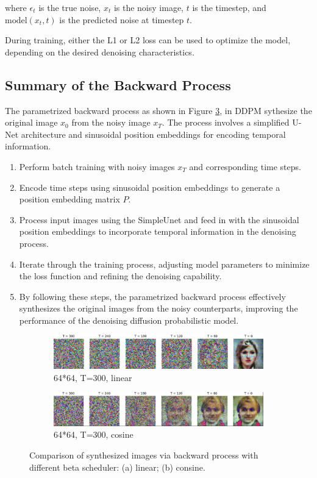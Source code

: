 \documentclass[letterpaper]{article} %
\begin{document}
\noindent where $\epsilon_t$ is the true noise, $x_t$ is the noisy image, $t$ is the timestep, and $\text{model}(x_t, t)$ is the predicted noise at timestep $t$.

During training, either the L1 or L2 loss can be used to optimize the model, depending on the desired denoising characteristics.

\subsection{Summary of the Backward Process}
The parametrized backward process as shown in Figure \ref{fig:figure4}, in DDPM sythesize the original image $x_0$ from the noisy image $x_T$. The process involves a simplified U-Net architecture and sinusoidal position embeddings for encoding temporal information.
\begin{enumerate}
\item Perform batch training with noisy images $x_T$ and corresponding time steps.
\item Encode time steps using sinusoidal position embeddings to generate a position embedding matrix $P$.
\item Process input images using the SimpleUnet and feed in with the sinusoidal position embeddings to incorporate temporal information in the denoising process.
\item Iterate through the training process, adjusting model parameters to minimize the loss function and refining the denoising capability.
\item By following these steps, the parametrized backward process effectively synthesizes the original images from the noisy counterparts, improving the performance of the denoising diffusion probabilistic model.
\end{enumerate}

\begin{figure}[htbp]
    \centering
    \begin{subfigure}{0.45\textwidth}
        \includegraphics[width=\textwidth]{f4.jpg}
        \caption{64*64, T=300, linear}
        \label{fig:figure4a}
    \end{subfigure}
    \hfill
    \begin{subfigure}{0.45\textwidth}
        \includegraphics[width=\textwidth]{f9.png} %
        \caption{64*64, T=300, cosine} %
        \label{fig:figure4b}
    \end{subfigure}
    \caption{Comparison of synthesized images via backward process with different beta scheduler: (a) linear; (b) consine.}
    \label{fig:figure4}
\end{figure}
\end{document}
